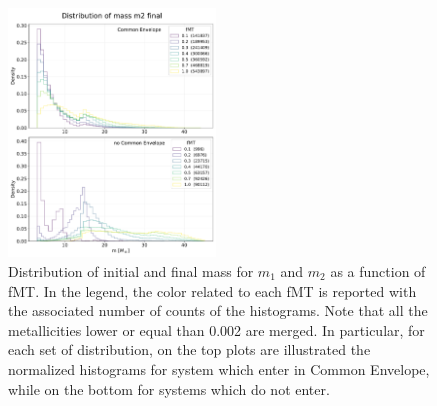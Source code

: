 \documentclass[prb,twocolumn,9pt]{revtex4-1}
\begin{document}
\begin{figure}[htp]
   \hskip 1mm
   \includegraphics[width=0.49\textwidth]{images/assignment2_1/hist_m2_fin_fMT.pdf}
   \vskip 0.3cm
    \caption{Distribution of initial and final mass for \(m_1\) and \(m_2\) as a function of fMT. In the legend, the color related to each  fMT is reported  with the associated number of counts of the histograms. Note that all the metallicities lower or equal than 0.002 are merged. In particular, for each set of distribution, on the top plots are illustrated the normalized histograms for system which enter in Common Envelope, while on the bottom for systems which do not enter.}
    \label{fig:ass2_masses}
\end{figure}
\end{document}

